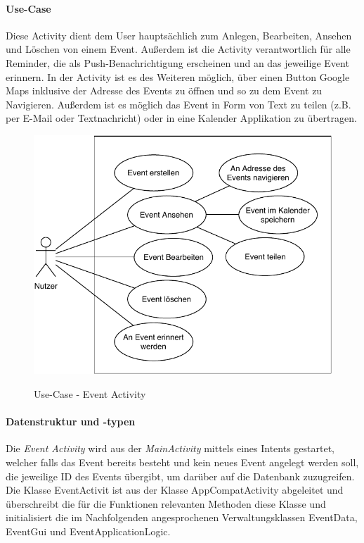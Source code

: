 \paragraph{Use-Case}
Diese Activity dient dem User hauptsächlich zum Anlegen, Bearbeiten, Ansehen und Löschen von einem Event. Außerdem ist die Activity verantwortlich für alle Reminder, die als Push-Benachrichtigung erscheinen und an das jeweilige Event erinnern. In der Activity ist es des Weiteren möglich, über einen Button Google Maps inklusive der Adresse des Events zu öffnen und so zu dem Event zu Navigieren. Außerdem ist es möglich das Event in Form von Text zu teilen (z.B. per E-Mail oder Textnachricht) oder in eine Kalender Applikation zu übertragen.

\begin{figure}[H]
	\centering
	\caption{Use-Case - Event Activity}
	\includegraphics[width=12cm]{img/EventActivityUseCase.pdf}
	\label{img:EventActivityUseCase}
\end{figure}

\paragraph{Datenstruktur und -typen}
Die \textit{Event Activity} wird aus der \textit{MainActivity} mittels eines Intents gestartet, welcher falls das Event bereits besteht und kein neues Event angelegt werden soll, die jeweilige ID des Events übergibt, um darüber auf die Datenbank zuzugreifen. Die Klasse EventActivit ist aus der Klasse AppCompatActivity abgeleitet und überschreibt die für die Funktionen relevanten Methoden diese Klasse und initialisiert die im Nachfolgenden angesprochenen Verwaltungsklassen EventData, EventGui und EventApplicationLogic.


